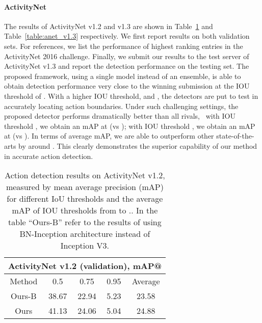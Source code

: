 \documentclass[10pt,twocolumn,letterpaper]{article}
\begin{document}
\paragraph{ActivityNet}
The results of ActivityNet v1.2 and v1.3 are shown in Table~\ref{table:anet_v1.2} and Table~\ref{table:anet_v1.3} respectively. 
We first report results on both validation sets.
For references, we list the performance of highest ranking entries in the ActivityNet 2016 challenge.
Finally, we submit our results to the test server of ActivityNet v1.3 and report the detection performance on the testing set.
The proposed framework, using a single model instead of an ensemble, is able to obtain detection performance very close to the winning submission at the IOU threshold of .
With a higher IOU threshold,  and , the detectors are put to test in accurately locating action boundaries.
Under such challenging settings, the proposed detector performs dramatically better than all rivals,
\eg~with IOU threshold , we obtain an mAP at  (vs );
with IOU threshold , we obtain an mAP at  (vs ).
In terms of average mAP, we are able to outperform other state-of-the-arts by around .
This clearly demonstrates the superior capability of our method in accurate action detection.


\begin{table}[t]
	\begin{center}
		\begin{tabular}{c|ccc|c}
			\hline
			\multicolumn{5}{c}{\textbf{ActivityNet v1.2} (validation),  \textbf{mAP@}}   \\ \hline
			Method & 0.5 & 0.75 & 0.95 &Average\\ \hline
			Ours-B &    38.67     &     22.94     &     5.23     &       23.58      \\ \hline
			Ours &    41.13     &     24.06     &     5.04     &       24.88      \\ \hline
		\end{tabular}

	\end{center}
	\caption{Action detection results on ActivityNet v1.2, measured by mean average precision (mAP) for different IoU thresholds  and the average mAP of IOU thresholds from  to ..
		In the table ``Ours-B'' refer to the results of using BN-Inception architecture instead of Inception V3.}
	\label{table:anet_v1.2}
\end{table}
\end{document}
